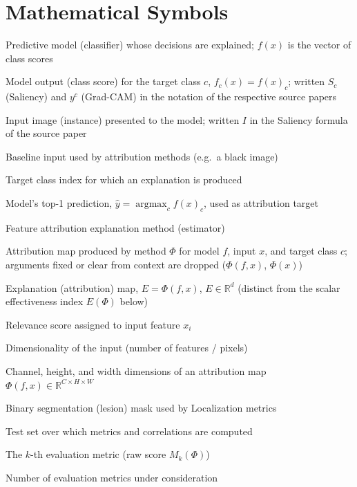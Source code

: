 \section*{Mathematical Symbols}

\begin{description}[leftmargin=3.4cm]
    \item[$f$] Predictive model (classifier) whose decisions are explained; $f(x)$ is the vector of class scores
    \item[$f_c$] Model output (class score) for the target class $c$, $f_c(x) = f(x)_c$; written $S_c$ (Saliency) and $y^c$ (Grad-CAM) in the notation of the respective source papers
    \item[$x$] Input image (instance) presented to the model; written $I$ in the Saliency formula of the source paper
    \item[$x'$] Baseline input used by attribution methods (e.g.\ a black image)
    \item[$c$] Target class index for which an explanation is produced
    \item[$\hat{y}$] Model's top-1 prediction, $\hat{y} = \operatorname{argmax}_c f(x)_c$, used as attribution target
    \item[$\Phi$] Feature attribution explanation method (estimator)
    \item[$\Phi(f, x, c)$] Attribution map produced by method $\Phi$ for model $f$, input $x$, and target class $c$; arguments fixed or clear from context are dropped ($\Phi(f, x)$, $\Phi(x)$)
    \item[$E$] Explanation (attribution) map, $E = \Phi(f, x)$, $E \in \mathbb{R}^{d}$ (distinct from the scalar effectiveness index $E(\Phi)$ below)
    \item[$E_i$, $R_i$] Relevance score assigned to input feature $x_i$
    \item[$d$] Dimensionality of the input (number of features / pixels)
    \item[$C, H, W$] Channel, height, and width dimensions of an attribution map $\Phi(f,x) \in \mathbb{R}^{C \times H \times W}$
    \item[$\mathcal{M}$] Binary segmentation (lesion) mask used by Localization metrics
    \item[$\mathcal{D}$] Test set over which metrics and correlations are computed
    \item[$M_k$] The $k$-th evaluation metric (raw score $M_k(\Phi)$)
    \item[$K$] Number of evaluation metrics under consideration

\end{description}
